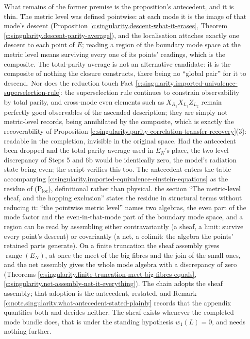 \documentclass[11pt]{article}
\theoremstyle{definition}
\theoremstyle{plain}
\providecommand{\EN}{}\renewcommand{\EN}{E_{N}}
\providecommand{\shL}{}\renewcommand{\shL}{L}
\begin{document}
\label{c:note.singularity.setting-step-5-descend-state-what-2}
What remains of the former premise is the proposition's antecedent, and it is thin. The metric level was defined pointwise: at each mode it is the image of that mode's descent (Proposition \ref{c:singularity.descent-what-it-erases}, Theorem \ref{c:singularity.descent-parity-average}), and the localisation attaches exactly one descent to each point of $E$; reading a region of the boundary mode space at the metric level means surviving every one of its points' readings, which is the composite. The total-parity average is not an alternative candidate: it is the composite of nothing the closure constructs, there being no ``global pair'' for it to descend. Nor does the reduction touch Fact \ref{c:singularity.imported-univalence-superselection-rule}: the superselection rule continues to constrain observability by total parity, and cross-mode even elements such as $X_{R_1}X_{L_1}Z_{L_2}$ remain perfectly good observables of the ascended description; they are simply not metric-level records, being annihilated by the composite, which is exactly the recoverability of Proposition \ref{c:singularity.purity-correlation-transfer-recovery}(3): readable in the completion, invisible in the original space. Had the antecedent been dropped and the total-parity average used in $\EN$'s place, the two-level discrepancy of Steps 5 and 6b would be identically zero, the model's radiation state being even; the script verifies this too. The antecedent enters the table accompanying \ref{c:singularity.imported-equivalence-einstein-equations} as the residue of (P$_{\mathrm{loc}}$), definitional rather than physical. the section ``The metric-level sheaf, and the hopping exclusion'' states the residue in structural terms without reducing it: ``the pointwise metric level'' names two algebras, the even part of the mode factor and the even-in-that-mode part of the boundary mode space, and a region can be read by assembling either contravariantly (a sheaf, a limit: survive every point's descent) or covariantly (a net, a colimit: the algebra the points' retained parts generate). On a finite truncation the sheaf assembly gives $\operatorname{range}(\EN)$, at once the meet of the big fibres and the join of the small ones, and the net assembly gives the whole mode algebra with a discrepancy of zero (Theorems \ref{c:singularity.finite-truncation-meet-big-fibres-equals}, \ref{c:singularity.net-assembly-net-it-everything}). The chain adopts the sheaf assembly; that adoption is the antecedent, restated, and Remark \ref{c:note.singularity.what-antecedent-stated-plainly} records that the appendix quantifies both and decides neither. The sheaf exists whenever the completed mode bundle does, that is under the standing hypothesis $w_1(\shL) = 0$, and needs nothing further.
\end{document}
